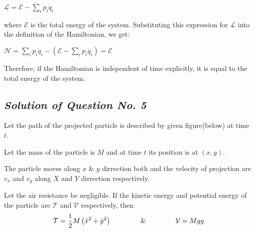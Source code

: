 \documentclass[12pt, a4paper]{article} %
\begin{document}
\begin{center}
    $\displaystyle \mathscr{L} = \mathscr{E} - \sum_i p_i\dot{q}_i$
\end{center}

where $\mathscr{E}$ is the total energy of the system. Substituting this expression for $\mathscr{L}$ into the definition of the Hamiltonian, we get:

\begin{center}
    $\displaystyle \mathscr{H} = \sum_i p_i\dot{q}_i - (\mathscr{E} - \sum_i p_i\dot{q}_i) = \mathscr{E}$
\end{center}

Therefore, if the Hamiltonian is independent of time explicitly, it is equal to the total energy of the system.

\newpage


\subsection{\slshape Solution of Question No. 5}


Let the path of the projected particle is described by given figure(below) at time $t$.

Let the mass of the particle is $M$ and at time $t$ its position is at $(x,y)$. 

The particle moves along $x$ \& $y$ dirrection both and the velocity of projection are $v_x$ and $v_y$ along $X$ and $Y$ dirrection respectively. 

\begin{center}
    \def\svgwidth{10cm}
    
\end{center}

Let the air resistance be negligible. If the kinetic energy and potential energy of the particle are $\mathcal{T}$ and $\mathcal{V}$ respectively, then 
\[\mathcal{T} = \frac{1}{2}M\left(\dot{x}^2 + \dot{y}^2\right)\hspace*{1.5cm} \& \hspace*{1.5cm} \mathcal{V} = Mgy\]
\end{document}

